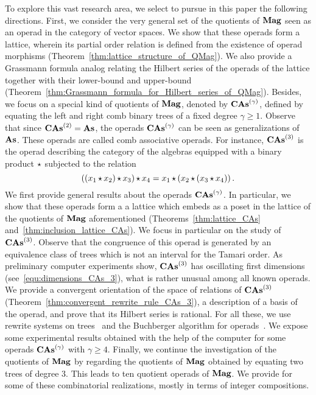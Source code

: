 To explore this vast research area, we select to pursue in this paper
the following directions. First, we consider the very general set of the
quotients of $\mathbf{Mag}$ seen as an operad in the category of vector spaces.
We show that these operads form a lattice, wherein its partial order
relation is defined from the existence of operad morphisms
(Theorem~\ref{thm:lattice_structure_of_QMag}). We also provide a
Grassmann formula analog relating the Hilbert series of the operads of
the lattice together with their lower-bound and upper-bound
(Theorem~\ref{thm:Grassmann_formula_for_Hilbert_series_of_QMag}).
Besides, we focus on a special kind of quotients of $\mathbf{Mag}$, denoted by
$\mathbf{CAs}^{\left(\gamma\right)}$, defined by equating the left and right comb binary trees
of a fixed degree $\gamma \geq 1$.
Observe that since $\mathbf{CAs}^{\left(2\right)}=\mathbf{As}$, the operads $\mathbf{CAs}^{\left(\gamma\right)}$ can be seen
as generalizations of $\mathbf{As}$. These operads are called comb
associative operads. For instance, $\mathbf{CAs}^{\left(3\right)}$ is the operad describing
the category of the algebras equipped with a binary product $\operatorname{\star}$
subjected to the relation
\begin{equation}
    \left(\left(x_1 \operatorname{\star} x_2\right) \operatorname{\star} x_3\right) \operatorname{\star} x_4
    =
    x_1 \operatorname{\star} \left(x_2 \operatorname{\star} \left(x_3 \operatorname{\star} x_4\right)\right).
\end{equation}
We first provide general results about the
operads $\mathbf{CAs}^{\left(\gamma\right)}$. In particular, we show that these operads form a
a lattice which embeds as a poset in the lattice of the quotients of
$\mathbf{Mag}$ aforementioned
(Theorems~\ref{thm:lattice_CAs} and~\ref{thm:inclusion_lattice_CAs}). We
focus in particular on the study of $\mathbf{CAs}^{\left(3\right)}$. Observe that the
congruence of this operad is generated by an equivalence class of trees
which is not an interval for the Tamari order. As preliminary computer
experiments show, $\mathbf{CAs}^{\left(3\right)}$ has oscillating first dimensions
(see~\eqref{equ:dimensions_CAs_3}), what is rather unusual among all
known operads. We provide a convergent orientation of the space of
relations of $\mathbf{CAs}^{\left(3\right)}$ (Theorem~\ref{thm:convergent_rewrite_rule_CAs_3}),
a description of a basis of the operad, and prove that its Hilbert series
is rational.
%
%
For all these, we use rewrite systems on trees~\cite{BN98} and the
Buchberger algorithm for operads~\cite{DK10}. We expose some
experimental results obtained with the help of the computer for some
operads $\mathbf{CAs}^{\left(\gamma\right)}$ with $\gamma \geq 4$. Finally, we continue the
investigation of the quotients of $\mathbf{Mag}$ by regarding the quotients of
$\mathbf{Mag}$ obtained by equating two trees of degree $3$. This leads to ten
quotient operads of $\mathbf{Mag}$. We provide for some of these combinatorial
realizations, mostly in terms of integer compositions.
\medbreak

